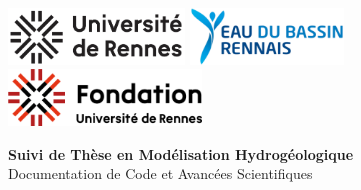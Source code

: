 
\begin{titlepage}
    \thispagestyle{empty}
    
    
    \begin{center}
      \includegraphics[height=1.5cm]{assets/figures/logos/Logo_Univ_Rennes.png}\hspace{1cm}%
      \includegraphics[height=1.5cm]{assets/figures/logos/Logo_EBR.png}\hspace{1cm}%
      \includegraphics[height=1.5cm]{assets/figures/logos/Logo_Fondation_Rennes.png}
      \vspace{2cm}
  
      {\Huge\textbf{Suivi de Thèse en Modélisation Hydrogéologique}}\\[0.5cm]
      {\Large Documentation de Code et Avancées Scientifiques}
      \vspace{1.5cm}
  

\end{center}
\end{titlepage}

